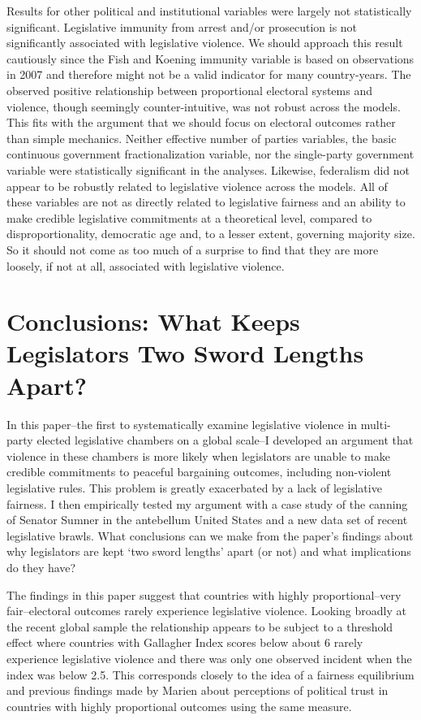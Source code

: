 \documentclass[a4paper]{article}\usepackage[]{graphicx}\usepackage[]{color}
\begin{document}
Results for other political and institutional variables were largely not statistically significant. Legislative immunity from arrest and/or prosecution is not significantly associated with legislative violence. We should approach this result cautiously since the Fish and Koening immunity variable is based on observations in 2007 and therefore might not be a valid indicator for many country-years. The observed positive relationship between proportional electoral systems and violence, though seemingly counter-intuitive, was not robust across the models. This fits with the argument that we should focus on electoral outcomes rather than simple mechanics. Neither effective number of parties variables, the basic continuous government fractionalization variable, nor the single-party government variable were statistically significant in the analyses. Likewise, federalism did not appear to be robustly related to legislative violence across the models. All of these variables are not as directly related to legislative fairness and an ability to make credible legislative commitments at a theoretical level, compared to disproportionality, democratic age and, to a lesser extent, governing majority size. So it should not come as too much of a surprise to find that they are more loosely, if not at all, associated with legislative violence.

\section*{Conclusions: What Keeps Legislators Two Sword Lengths Apart?}

In this paper--the first to systematically examine legislative violence in multi-party elected legislative chambers on a global scale--I developed an argument that violence in these chambers is more likely when legislators are unable to make credible commitments to peaceful bargaining outcomes, including non-violent legislative rules. This problem is greatly exacerbated by a lack of legislative fairness. I then empirically tested my argument with a case study of the canning of Senator Sumner in the antebellum United States and a new data set of recent legislative brawls. What conclusions can we make from the paper's findings about why legislators are kept `two sword lengths' apart (or not) and what implications do they have?

The findings in this paper suggest that countries with highly proportional--very fair--electoral outcomes rarely experience legislative violence. Looking broadly at the recent global sample the relationship appears to be subject to a threshold effect where countries with Gallagher Index scores below about 6 rarely experience legislative violence and there was only one observed incident when the index was below 2.5. This corresponds closely to the idea of a fairness equilibrium and previous findings made by Marien \citeyearpar{Marien2011} about perceptions of political trust in countries with highly proportional outcomes using the same measure. 
\end{document}
